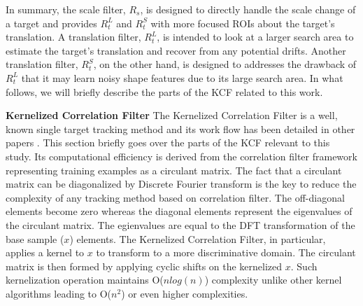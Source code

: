 \documentclass[10pt,twocolumn,letterpaper]{article}
\begin{document}
In summary, the scale filter, $R_{s}$, is designed to directly handle
the scale change of a target and provides $R_{t}^{L}$ and $R_{t}^{S}$
with more focused ROIs about the target's translation. A translation
filter, $R_{t}^{L}$, is intended to look at a larger search area to
estimate the target's translation and recover from any potential
drifts. Another translation filter, $R_{t}^{S}$, on the other hand, is
designed to addresses the drawback of $R_{t}^{L}$ that it may learn
noisy shape features due to its large search area. In what follows, we
will briefly describe the parts of the KCF related to this work.

\textbf{Kernelized Correlation Filter} The Kernelized Correlation
Filter is a well, known single target tracking method and its work
flow has been detailed in other papers
\cite{henriques2012exploiting,henriques2015high}. This section briefly
goes over the parts of the KCF relevant to this study. Its
computational efficiency is derived from the correlation filter
framework representing training examples as a circulant matrix. The
fact that a circulant matrix can be diagonalized by Discrete Fourier
transform is the key to reduce the complexity of any tracking method
based on correlation filter. The off-diagonal elements become zero
whereas the diagonal elements represent the eigenvalues of the
circulant matrix. The egienvalues are equal to the DFT transformation
of the base sample ($x$) elements. The Kernelized Correlation Filter,
in particular, applies a kernel to $x$ to transform to a more
discriminative domain. The circulant matrix is then formed by applying
cyclic shifts on the kernelized $x$. Such kernelization operation
maintains O($nlog(n)$) complexity unlike other kernel algorithms
leading to O($n^{2}$) or even higher complexities.
\end{document}
